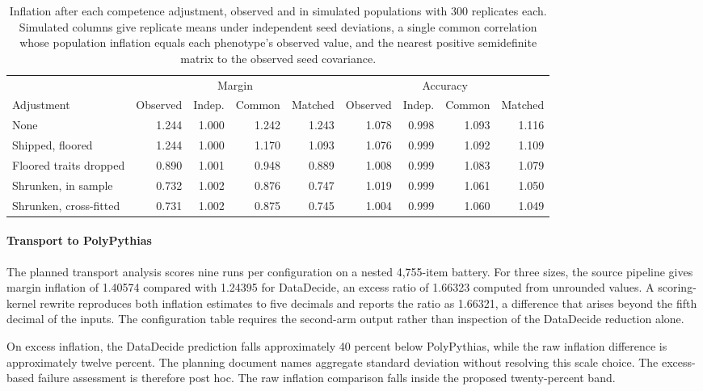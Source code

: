 \begin{table}[h]
\centering
\small
\caption{Inflation after each competence adjustment, observed and in simulated populations with 300 replicates each. Simulated columns give replicate means under independent seed deviations, a single common correlation whose population inflation equals each phenotype's observed value, and the nearest positive semidefinite matrix to the observed seed covariance.}
\label{tab:proxy}
\setlength{\tabcolsep}{3pt}
\begin{tabular}{lrrrrrrrr}
\toprule
& \multicolumn{4}{c}{Margin} & \multicolumn{4}{c}{Accuracy} \\
\cmidrule(lr){2-5}\cmidrule(lr){6-9}
Adjustment & Observed & Indep. & Common & Matched & Observed & Indep. & Common & Matched \\
\midrule
None & 1.244 & 1.000 & 1.242 & 1.243 & 1.078 & 0.998 & 1.093 & 1.116 \\
Shipped, floored & 1.244 & 1.000 & 1.170 & 1.093 & 1.076 & 0.999 & 1.092 & 1.109 \\
Floored traits dropped & 0.890 & 1.001 & 0.948 & 0.889 & 1.008 & 0.999 & 1.083 & 1.079 \\
Shrunken, in sample & 0.732 & 1.002 & 0.876 & 0.747 & 1.019 & 0.999 & 1.061 & 1.050 \\
Shrunken, cross-fitted & 0.731 & 1.002 & 0.875 & 0.745 & 1.004 & 0.999 & 1.060 & 1.049 \\
\bottomrule
\end{tabular}
\end{table}


\paragraph{Transport to PolyPythias}
The planned transport analysis scores nine runs per configuration on a nested 4,755-item battery. For three sizes, the source pipeline gives margin inflation of 1.40574 compared with 1.24395 for DataDecide, an excess ratio of 1.66323 computed from unrounded values. A scoring-kernel rewrite reproduces both inflation estimates to five decimals and reports the ratio as 1.66321, a difference that arises beyond the fifth decimal of the inputs. The configuration table requires the second-arm output rather than inspection of the DataDecide reduction alone.

On excess inflation, the DataDecide prediction falls approximately 40 percent below PolyPythias, while the raw inflation difference is approximately twelve percent. The planning document names aggregate standard deviation without resolving this scale choice. The excess-based failure assessment is therefore post hoc. The raw inflation comparison falls inside the proposed twenty-percent band.

